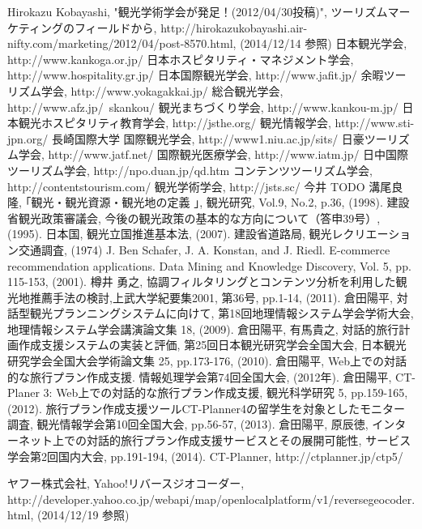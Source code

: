 \begin{thebibliography}{report}
 Hirokazu Kobayashi, "観光学術学会が発足！(2012/04/30投稿)", ツーリズムマーケティングのフィールドから, http://hirokazukobayashi.air-nifty.com/marketing/2012/04/post-8570.html, (2014/12/14 参照)
 日本観光学会, http://www.kankoga.or.jp/
 日本ホスピタリティ・マネジメント学会, http://www.hospitality.gr.jp/
 日本国際観光学会, http://www.jafit.jp/
 余暇ツーリズム学会, http://www.yokagakkai.jp/
 総合観光学会, http://www.afz.jp/~skankou/
 観光まちづくり学会, http://www.kankou-m.jp/
 日本観光ホスピタリティ教育学会, http://jsthe.org/
 観光情報学会, http://www.sti-jpn.org/
 長崎国際大学 国際観光学会, http://www1.niu.ac.jp/sits/
 日豪ツーリズム学会, http://www.jatf.net/
 国際観光医療学会, http://www.iatm.jp/
 日中国際ツーリズム学会, http://npo.duan.jp/qd.htm
 コンテンツツーリズム学会, http://contentstourism.com/
 観光学術学会, http://jsts.sc/
 今井 TODO
 溝尾良隆, ｢観光・観光資源・観光地の定義 ｣, 観光研究, Vol.9, No.2, p.36, (1998).
 建設省観光政策審議会, 今後の観光政策の基本的な方向について（答申39号）, (1995).
 日本国, 観光立国推進基本法, (2007).
 建設省道路局, 観光レクリエーション交通調査, (1974)
 J. Ben Schafer, J. A. Konstan, and J. Riedl. E-commerce recommendation applications. Data Mining and Knowledge Discovery, Vol. 5, pp. 115-153, (2001).
 樽井 勇之, 協調フィルタリングとコンテンツ分析を利用した観光地推薦手法の検討,上武大学紀要集2001, 第36号, pp.1-14, (2011).
 倉田陽平, 対話型観光プランニングシステムに向けて, 第18回地理情報システム学会学術大会, 地理情報システム学会講演論文集 18, (2009).
 倉田陽平, 有馬貴之, 対話的旅行計画作成支援システムの実装と評価, 第25回日本観光研究学会全国大会, 日本観光研究学会全国大会学術論文集 25, pp.173-176, (2010).
 倉田陽平, Web上での対話的な旅行プラン作成支援. 情報処理学会第74回全国大会, (2012年).
 倉田陽平, CT-Planer 3: Web上での対話的な旅行プラン作成支援, 観光科学研究 5, pp.159-165, (2012). 
 旅行プラン作成支援ツールCT-Planner4の留学生を対象としたモニター調査, 観光情報学会第10回全国大会, pp.56-57, (2013).
 倉田陽平, 原辰徳, インターネット上での対話的旅行プラン作成支援サービスとその展開可能性, サービス学会第2回国内大会, pp.191-194, (2014).
 CT-Planner, http://ctplanner.jp/ctp5/

 ヤフー株式会社, Yahoo!リバースジオコーダー, \\ http://developer.yahoo.co.jp/webapi/map/openlocalplatform/v1/reversegeocoder.html, (2014/12/19 参照)
\end{thebibliography}
